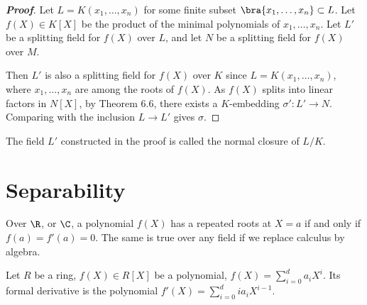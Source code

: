 \begin{proof}[\bf Proof]
Let $L = K(x_1, \dots , x_n)$ for some finite subset $\bra{x_1, \dots , x_n} \subset L$. Let $f(X) \in K[X]$ be the product of the minimal polynomials of $x_1, \dots , x_n$. Let $L'$ be a splitting field for $f(X)$ over $L$, and let $N$ be a splitting field for $f(X)$ over $M$.



Then $L'$ is also a splitting field for $f(X)$ over $K$ since $L = K(x_1, \dots , x_n)$, where $x_1, \dots , x_n$ are among the roots of $f(X)$. As $f(X)$ splits into linear factors in $N[X]$, by Theorem 6.6, there exists a $K$-embedding $\sigma' : L' \to N$. Comparing with the inclusion $L \to L'$ gives $\sigma$.
\end{proof}

\begin{remark}
The field $L'$ constructed in the proof is called the normal closure of $L/K$.
\end{remark}

\section{Separability}

Over $\R$, or $\C$, a polynomial $f(X)$ has a repeated roots at $X = a$ if and only if $f(a) = f'(a) = 0$. The same is true over any field if we replace calculus by algebra.

\begin{definition}
Let $R$ be a ring, $f(X) \in R[X]$ be a polynomial, $f(X) = \sum^d_{i=0} a_iX^i$. Its formal derivative is the polynomial $f'(X) = \sum^d_{i=0} i a_i X^{i-1}$.
\end{definition}

